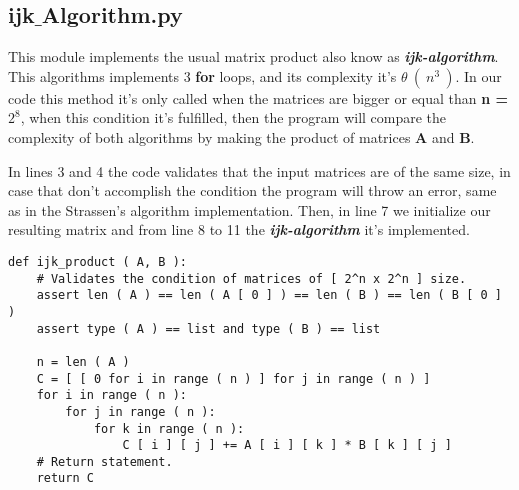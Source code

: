 \subsection{ijk$\_$Algorithm.py}

This module implements the usual matrix product also know as {\bfseries\itshape ijk-algorithm}. This algorithms implements 3 {\bfseries for} loops, and its complexity it's $\theta\ (\ n^{3}\ )$. In our code this method it's only called when the matrices are bigger or equal than {\bfseries n = $2^{8}$}, when this condition it's fulfilled, then the program will compare the complexity of both algorithms by making the product of matrices {\bfseries A} and {\bfseries B}.  \hfill \break

In lines 3 and 4 the code validates that the input matrices are of the same size, in case that don't accomplish the condition the program will throw an error, same as in the Strassen's algorithm implementation. Then, in line 7 we initialize our resulting matrix and from line 8 to 11 the {\bfseries\itshape ijk-algorithm} it's implemented. \hfill \break

\begin{lstlisting}
def ijk_product ( A, B ):
    # Validates the condition of matrices of [ 2^n x 2^n ] size.
    assert len ( A ) == len ( A [ 0 ] ) == len ( B ) == len ( B [ 0 ] )
    assert type ( A ) == list and type ( B ) == list

    n = len ( A )
    C = [ [ 0 for i in range ( n ) ] for j in range ( n ) ]
    for i in range ( n ):
        for j in range ( n ):
            for k in range ( n ):
                C [ i ] [ j ] += A [ i ] [ k ] * B [ k ] [ j ]
    # Return statement.
    return C
\end{lstlisting}

\pagebreak